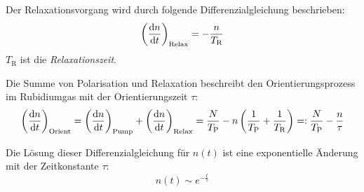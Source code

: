 Der Relaxationsvorgang wird durch folgende Differenzialgleichung beschrieben:
\begin{equation}
  \left(\frac{\mathrm{d} n}{\mathrm{d} t}\right)_{\text{Relax}}=-\frac{n}{T_\text{R}}
\end{equation}
$T_\text{R}$ ist die \emph{Relaxationszeit}.

Die Summe von Polarisation und Relaxation beschreibt den Orientierungsprozess im Rubidiumgas mit
der Orientierungszeit $\tau$:
\begin{equation}
\label{eq:orientierungszeit}
  \left(\frac{\mathrm{d} n}{\mathrm{d} t}\right)_{\text{Orient}}
  =\left(\frac{\mathrm{d} n}{\mathrm{d} t}\right)_{\text{Pump}} + \left(\frac{\mathrm{d} n}{\mathrm{d} t}\right)_{\text{Relax}}
  =\frac{N}{T_\text{P}}-n \left( \frac{1}{T_\text{P}} + \frac{1}{T_\text{R}}\right)
  =:\frac{N}{T_\text{P}}- \frac{n}{\tau}
\end{equation}

Die Lösung dieser Differenzialgleichung für $n(t)$ ist eine exponentielle Änderung mit der Zeitkonstante $\tau$:
\begin{equation}
\label{eq:expabhorient}
   n(t) \sim e^{-\frac{t}{\tau}}
\end{equation}


